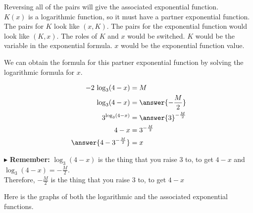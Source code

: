 \documentclass{ximera}
\begin{document}
Reversing all of the pairs will give the associated exponential function.  \\



$K(x)$ is a logarithmic function, so it must have a partner exponential function.  The pairs for $K$ look like $(x, K)$. The pairs for the exponential function would look like $(K, x)$.  The roles of $K$ and $x$ would be switched. $K$ would be the variable in the exponential formula. $x$ would be the exponential function value.


We can obtain the formula for this partner exponential function by solving the logarithmic formula for $x$.



\begin{explanation}

\begin{align*}
-2 \,\log_3(4-x) & = M \\
\log_3(4-x) & = \answer{-\frac{M}{2}} \\
3^{\log_3(4-x)} & = \answer{3}^{-\frac{M}{2}} \\
4 - x & = 3^{-\frac{M}{2}} \\
\answer{4 - 3^{-\frac{M}{2}}} & = x \\
\end{align*}

\end{explanation}




$\blacktriangleright$ \textbf{Remember:} $\log_3(4-x)$ is the thing that you raise $3$ to, to get $4-x$ and $\log_3(4-x) = - \frac{M}{2}$.  \\

Therefore, $- \frac{M}{2}$ is the thing that you raise $3$ to, to get $4-x$





Here is the graphs of both the logarithmic and the associated exponential functions.
\end{document}
